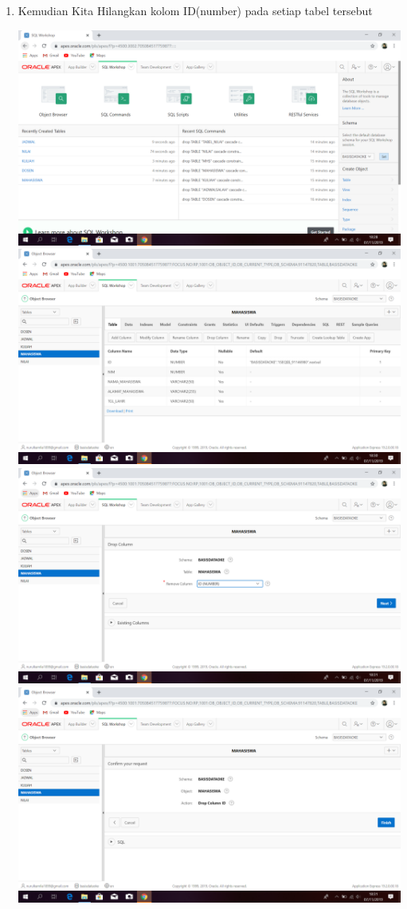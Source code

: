 \documentclass{article}
\begin{document}
\begin{enumerate}
\begin{enumerate}
\begin{center}
    \end{center}
    \item Kemudian Kita Hilangkan kolom ID(number) pada setiap tabel tersebut
     \begin{center}
    \includegraphics[width=.8\textwidth]{figure/16.PNG}
    \includegraphics[width=.8\textwidth]{figure/17.PNG}
    \includegraphics[width=.8\textwidth]{figure/18.PNG}
    \includegraphics[width=.8\textwidth]{figure/19.PNG}

\end{center}
\end{enumerate}
\end{enumerate}
\end{document}
